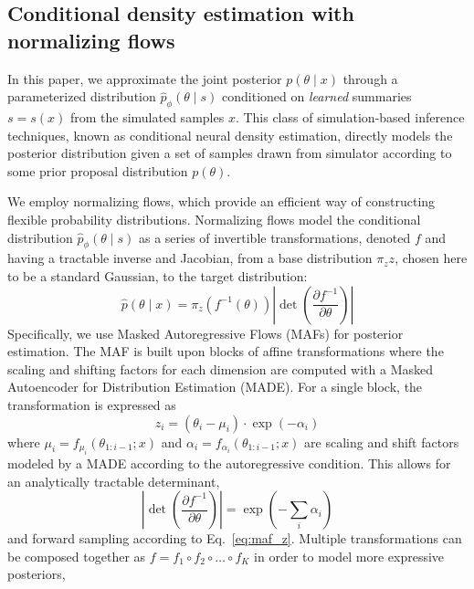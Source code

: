 \documentclass[prd,aps,10pt,nofootinbib,twocolumn,superscriptaddress,preprintnumbers,balancelastpage,longbibliography]{revtex4-1}
\begin{document}
\subsection{Conditional density estimation with normalizing flows}

In this paper, we approximate the joint posterior $p(\theta\mid x)$ through a parameterized distribution $\hat p_\phi(\theta\mid s)$ conditioned on \emph{learned} summaries $s=s(x)$ from the simulated samples $x$. This class of simulation-based inference techniques, known as conditional neural density estimation, directly models the posterior distribution given a set of samples drawn from simulator according to some prior proposal distribution $p(\theta)$.

We employ normalizing flows, which provide an efficient way of constructing flexible probability distributions. Normalizing flows model the conditional distribution $\hat p_\phi(\theta\mid s)$ as a series of invertible transformations, denoted $f$ and having a tractable inverse and Jacobian, from a base distribution $\pi_z{z}$, chosen here to be a standard Gaussian, to the target distribution:
\begin{equation}
    \hat{p}({\theta} \mid {x})=\pi_{z}\left(f^{-1}({\theta})\right)\left|\operatorname{det}\left(\frac{\partial f^{-1}}{\partial {\theta}}\right)\right|
\end{equation}
Specifically, we use Masked Autoregressive Flows (MAFs) for posterior estimation. The MAF is built upon blocks of affine transformations where the scaling and shifting factors for each dimension are computed with a Masked Autoencoder for Distribution Estimation (MADE). For a single block, the transformation is expressed as 
\begin{equation}
    \label{eq:maf_z}
    z_{i}=\left(\theta_{i}-\mu_{i}\right) \cdot \exp \left(-\alpha_{i}\right)
\end{equation}
where $\mu_{i}=f_{\mu_{i}}\left({\theta}_{1: i-1} ; {x}\right)$ and $\alpha_i = f_{\alpha_{i}}\left({\theta}_{1: i-1} ; {x}\right)$ are scaling and shift factors modeled by a MADE according to the autoregressive condition. This allows for an analytically tractable determinant,
\begin{equation}
    \label{eq:det}
    \left|\operatorname{det}\left(\frac{\partial f^{-1}}{\partial {\theta}}\right)\right|=\exp \left(-\sum_{i} \alpha_{i}\right)
\end{equation}
and forward sampling according to Eq.~\ref{eq:maf_z}.
Multiple transformations can be composed together as $f=f_{1} \circ f_{2} \circ \ldots \circ f_{K}$ in order to model more expressive posteriors,
\end{document}
